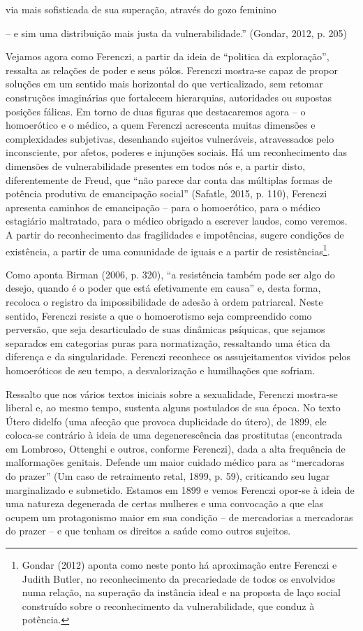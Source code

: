 via mais sofisticada de sua superação, através do gozo feminino

-- e sim uma distribuição mais justa da vulnerabilidade.'' (Gondar,
2012, p. 205)

Vejamos agora como Ferenczi, a partir da ideia de ``politica da
exploração'', ressalta as relações de poder e seus pólos. Ferenczi
mostra-se capaz de propor soluções em um sentido mais horizontal do que
verticalizado, sem retomar construções imaginárias que fortalecem
hierarquias, autoridades ou supostas posições fálicas. Em torno de duas
figuras que destacaremos agora -- o homoerótico e o médico, a quem
Ferenczi acrescenta muitas dimensões e complexidades subjetivas,
desenhando sujeitos vulneráveis, atravessados pelo inconsciente, por
afetos, poderes e injunções sociais. Há um reconhecimento das dimensões
de vulnerabilidade presentes em todos nós e, a partir disto,
diferentemente de Freud, que ``não parece dar conta das múltiplas formas
de potência produtiva de emancipação social'' (Safatle, 2015, p. 110),
Ferenczi apresenta caminhos de emancipação -- para o homoerótico, para o
médico estagiário maltratado, para o médico obrigado a escrever laudos,
como veremos. A partir do reconhecimento das fragilidades e impotências,
sugere condições de existência, a partir de uma comunidade de iguais e a
partir de resistências\footnote{Gondar (2012) aponta como neste ponto há
  aproximação entre Ferenczi e Judith Butler, no reconhecimento da
  precariedade de todos os envolvidos numa relação, na superação da
  instância ideal e na proposta de laço social construído sobre o
  reconhecimento da vulnerabilidade, que conduz à potência.}.

Como aponta Birman (2006, p. 320), ``a resistência também pode ser algo
do desejo, quando é o poder que está efetivamente em causa'' e, desta
forma, recoloca o registro da impossibilidade de adesão à ordem
patriarcal. Neste sentido, Ferenczi resiste a que o homoerotismo seja
compreendido como perversão, que seja desarticulado de suas dinâmicas
psíquicas, que sejamos separados em categorias puras para normatização,
ressaltando uma ética da diferença e da singularidade. Ferenczi
reconhece os assujeitamentos vividos pelos homoeróticos de seu tempo, a
desvalorização e humilhações que sofriam.

Ressalto que nos vários textos iniciais sobre a sexualidade, Ferenczi
mostra-se liberal e, ao mesmo tempo, sustenta alguns postulados de sua
época. No texto Útero didelfo (uma afecção que provoca duplicidade do
útero), de 1899, ele coloca-se contrário à ideia de uma degenerescência
das prostitutas (encontrada em Lombroso, Ottenghi e outros, conforme
Ferenczi), dada a alta frequência de malformações genitais. Defende um
maior cuidado médico para as ``mercadoras do prazer'' (Um caso de
retraimento retal, 1899, p. 59), criticando seu lugar marginalizado e
submetido. Estamos em 1899 e vemos Ferenczi opor-se à ideia de uma
natureza degenerada de certas mulheres e uma convocação a que elas
ocupem um protagonismo maior em sua condição -- de mercadorias a
mercadoras do prazer -- e que tenham os direitos a saúde como outros
sujeitos.

